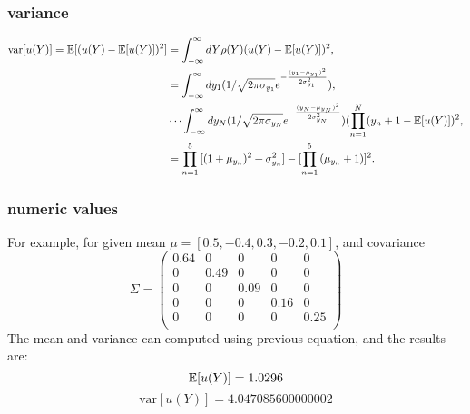 \subsubsection{variance}
\begin{align}
\text{var}[u(Y)]=\mathbb{E}[ (u(Y)-\mathbb{E}[ u(Y)])^2] &= \int_{-\infty}^\infty dY \rho(Y)(u(Y)-\mathbb{E}[ u(Y)])^2,\notag \\
  &=\int_{-\infty}^\infty dy_1 (1/\sqrt{2 \pi \sigma_{y_1}}e^{-\frac{(y_1-\mu_{y_1})^2}{2\sigma_{y_1}^2}}), \notag \\
  &\cdots\int_{-\infty}^\infty dy_N  (1/\sqrt{2 \pi \sigma_{y_N}}e^{-\frac{(y_N-\mu_{y_N})^2}{2\sigma_{y_N}^2}})(\prod_{n=1}^N (y_n+1-\mathbb{E}[ u(Y)])^2,\\
  &=\prod_{n=1}^5{[(1+\mu_{y_n})^2+\sigma_{y_n}^2]} - [\prod_{n=1}^5{(\mu_{y_n}+1)}]^2. \notag
\end{align}
\subsubsection{numeric values}
For example, for given mean $\mu = [0.5, -0.4, 0.3, -0.2, 0.1]$, and covariance
\begin{equation}
\Sigma =
\begin{pmatrix}
0.64 & 0 & 0 & 0 & 0 \\
0 & 0.49 & 0 & 0 & 0 \\
0 & 0 & 0.09 & 0 & 0 \\
0 & 0 & 0 & 0.16 & 0 \\
0 & 0 & 0 & 0 & 0.25 \\
\end{pmatrix}
\end{equation}
The mean and variance can computed using previous equation, and the results are:
\begin{equation}
\mathbb{E}[ u(Y)] = 1.0296
\end{equation}
\begin{equation}
\text{var}[u(Y)] = 4.047085600000002
\end{equation}

